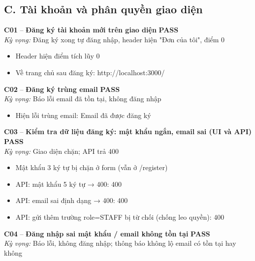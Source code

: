 \documentclass[a4paper,11pt]{article}
\newcommand{\ok}{\textcolor{okgreen}{\textbf{PASS}}}
\begin{document}
\subsection{C. Tài khoản và phân quyền giao diện}
\begin{minipage}{\textwidth}\vspace{4pt}\textbf{\textcolor{brew}{C01}} -- \textbf{Đăng ký tài khoản mới trên giao diện} \hfill \ok\\
{\small\emph{Kỳ vọng:} Đăng ký xong tự đăng nhập, header hiện "Đơn của tôi", điểm 0}
\end{minipage}
\begin{itemize}\footnotesize
\item \tick Header hiện điểm tích lũy 0
\item \tick Về trang chủ sau đăng ký: http://localhost:3000/
\end{itemize}
\begin{minipage}{\textwidth}\vspace{4pt}\textbf{\textcolor{brew}{C02}} -- \textbf{Đăng ký trùng email} \hfill \ok\\
{\small\emph{Kỳ vọng:} Báo lỗi email đã tồn tại, không đăng nhập}
\end{minipage}
\begin{itemize}\footnotesize
\item \tick Hiện lỗi trùng email: Email đã được đăng ký
\end{itemize}
\begin{minipage}{\textwidth}\vspace{4pt}\textbf{\textcolor{brew}{C03}} -- \textbf{Kiểm tra dữ liệu đăng ký: mật khẩu ngắn, email sai (UI và API)} \hfill \ok\\
{\small\emph{Kỳ vọng:} Giao diện chặn; API trả 400}
\end{minipage}
\begin{itemize}\footnotesize
\item \tick Mật khẩu 3 ký tự bị chặn ở form (vẫn ở /register)
\item \tick API: mật khẩu 5 ký tự → 400: 400
\item \tick API: email sai định dạng → 400: 400
\item \tick API: gửi thêm trường role=STAFF bị từ chối (chống leo quyền): 400
\end{itemize}
\begin{minipage}{\textwidth}\vspace{4pt}\textbf{\textcolor{brew}{C04}} -- \textbf{Đăng nhập sai mật khẩu / email không tồn tại} \hfill \ok\\
{\small\emph{Kỳ vọng:} Báo lỗi, không đăng nhập; thông báo không lộ email có tồn tại hay không}
\end{minipage}
\end{document}
